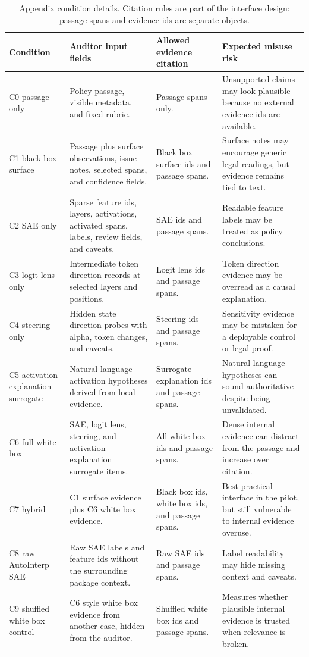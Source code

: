 \documentclass{article}
\begin{document}
\begin{table}[h]
    \centering
    \caption{Appendix condition details. Citation rules are part of the interface design: passage spans and evidence ids are separate objects.}
    \label{tab:appendix-condition-details}
    \scriptsize
    \begin{tabular}{@{}p{}p{}p{}p{}@{}}
        \toprule
        Condition & Auditor input fields & Allowed evidence citation & Expected misuse risk \\
        \midrule
        C0 passage only & Policy passage, visible metadata, and fixed rubric. & Passage spans only. & Unsupported claims may look plausible because no external evidence ids are available. \\
        C1 black box surface & Passage plus surface observations, issue notes, selected spans, and confidence fields. & Black box surface ids and passage spans. & Surface notes may encourage generic legal readings, but evidence remains tied to text. \\
        C2 SAE only & Sparse feature ids, layers, activations, activated spans, labels, review fields, and caveats. & SAE ids and passage spans. & Readable feature labels may be treated as policy conclusions. \\
        C3 logit lens only & Intermediate token direction records at selected layers and positions. & Logit lens ids and passage spans. & Token direction evidence may be overread as a causal explanation. \\
        C4 steering only & Hidden state direction probes with alpha, token changes, and caveats. & Steering ids and passage spans. & Sensitivity evidence may be mistaken for a deployable control or legal proof. \\
        C5 activation explanation surrogate & Natural language activation hypotheses derived from local evidence. & Surrogate explanation ids and passage spans. & Natural language hypotheses can sound authoritative despite being unvalidated. \\
        C6 full white box & SAE, logit lens, steering, and activation explanation surrogate items. & All white box ids and passage spans. & Dense internal evidence can distract from the passage and increase over citation. \\
        C7 hybrid & C1 surface evidence plus C6 white box evidence. & Black box ids, white box ids, and passage spans. & Best practical interface in the pilot, but still vulnerable to internal evidence overuse. \\
        C8 raw AutoInterp SAE & Raw SAE labels and feature ids without the surrounding package context. & Raw SAE ids and passage spans. & Label readability may hide missing context and caveats. \\
        C9 shuffled white box control & C6 style white box evidence from another case, hidden from the auditor. & Shuffled white box ids and passage spans. & Measures whether plausible internal evidence is trusted when relevance is broken. \\
        \bottomrule
    \end{tabular}
\end{table}
\end{document}
